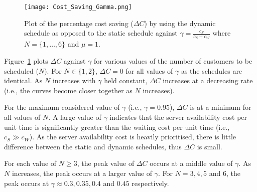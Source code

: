 \begin{figure}[htb]
	\centering
	\texttt{[image: Cost\_Saving\_Gamma.png]}
	\caption{Plot of the percentage cost saving ($\Delta C$) by using the dynamic schedule as opposed to the static schedule against $\gamma = \frac{c_{S}}{c_{S} + c_{W}}$ where $N = \{ 1, \ldots, 6 \}$ and $\mu = 1$.}
	\label{Graph_Cost_Saving}
\end{figure}

Figure~\ref{Graph_Cost_Saving} plots $\Delta C$ against $\gamma$ for various values of the number of customers to be scheduled ($N$). For $N \in \{ 1, 2 \}$, $\Delta C = 0$ for all values of $\gamma$ as the schedules are identical. As $N$ increases with $\gamma$ held constant, $\Delta C$ increases at a decreasing rate (i.e., the curves become closer together as $N$ increases).

For the maximum considered value of $\gamma$ (i.e., $\gamma = 0.95$), $\Delta C$ is at a minimum for all values of $N$. A large value of $\gamma$ indicates that the server availability cost per unit time is significantly greater than the waiting cost per unit time (i.e., $c_{S} \gg c_{W}$). As the server availability cost is heavily prioritised, there is little difference between the static and dynamic schedules, thus $\Delta C$ is small.

For each value of $N \geq 3$, the peak value of $\Delta C$ occurs at a middle value of $\gamma$. As $N$ increases, the peak occurs at a larger value of $\gamma$. For $N = 3, 4, 5$ and $6$, the peak occurs at $\gamma \approx 0.3, 0.35, 0.4$ and $0.45$ respectively.
